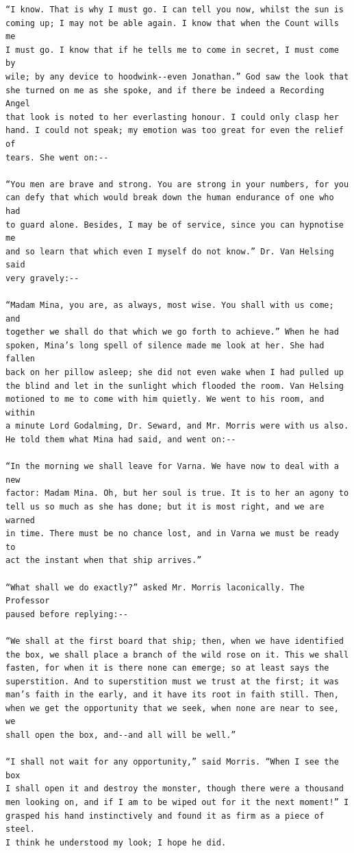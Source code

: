 \documentclass{article}
\begin{document}
\begin{verbatim}
“I know. That is why I must go. I can tell you now, whilst the sun is
coming up; I may not be able again. I know that when the Count wills me
I must go. I know that if he tells me to come in secret, I must come by
wile; by any device to hoodwink--even Jonathan.” God saw the look that
she turned on me as she spoke, and if there be indeed a Recording Angel
that look is noted to her everlasting honour. I could only clasp her
hand. I could not speak; my emotion was too great for even the relief of
tears. She went on:--

“You men are brave and strong. You are strong in your numbers, for you
can defy that which would break down the human endurance of one who had
to guard alone. Besides, I may be of service, since you can hypnotise me
and so learn that which even I myself do not know.” Dr. Van Helsing said
very gravely:--

“Madam Mina, you are, as always, most wise. You shall with us come; and
together we shall do that which we go forth to achieve.” When he had
spoken, Mina’s long spell of silence made me look at her. She had fallen
back on her pillow asleep; she did not even wake when I had pulled up
the blind and let in the sunlight which flooded the room. Van Helsing
motioned to me to come with him quietly. We went to his room, and within
a minute Lord Godalming, Dr. Seward, and Mr. Morris were with us also.
He told them what Mina had said, and went on:--

“In the morning we shall leave for Varna. We have now to deal with a new
factor: Madam Mina. Oh, but her soul is true. It is to her an agony to
tell us so much as she has done; but it is most right, and we are warned
in time. There must be no chance lost, and in Varna we must be ready to
act the instant when that ship arrives.”

“What shall we do exactly?” asked Mr. Morris laconically. The Professor
paused before replying:--

“We shall at the first board that ship; then, when we have identified
the box, we shall place a branch of the wild rose on it. This we shall
fasten, for when it is there none can emerge; so at least says the
superstition. And to superstition must we trust at the first; it was
man’s faith in the early, and it have its root in faith still. Then,
when we get the opportunity that we seek, when none are near to see, we
shall open the box, and--and all will be well.”

“I shall not wait for any opportunity,” said Morris. “When I see the box
I shall open it and destroy the monster, though there were a thousand
men looking on, and if I am to be wiped out for it the next moment!” I
grasped his hand instinctively and found it as firm as a piece of steel.
I think he understood my look; I hope he did.


\end{verbatim}
\end{document}
